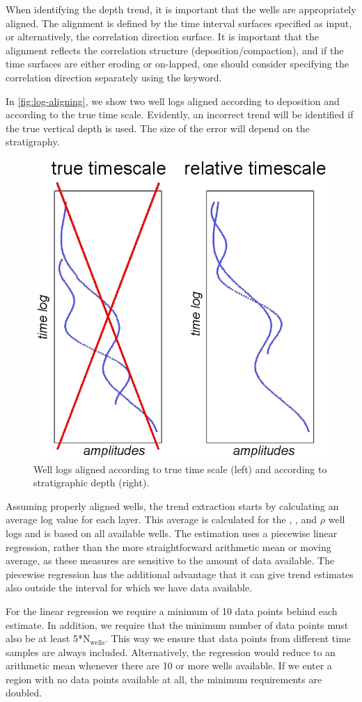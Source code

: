 When identifying the depth trend, it is important that the wells are
appropriately aligned. The alignment is defined by the time interval
surfaces specified as input, or alternatively, the correlation
direction surface. It is important that the alignment reflects the
correlation structure (deposition/compaction), and if the time
surfaces are either eroding or on-lapped, one should consider specifying
the correlation direction separately using the
 keyword.

In \autoref{fig:log-aligning}, we show two well logs aligned according
to deposition and according to the true time scale. Evidently, an
incorrect trend will be identified if the true vertical depth is
used. The size of the error will depend on the stratigraphy.

\begin{figure}
\centering
\includegraphics[width=.45\linewidth]{images/implementation/Trend-analysis_dep-vs-comp}
\caption{Well logs aligned according to true time scale (left) and
         according to stratigraphic depth (right).}
\label{fig:log-aligning}
\end{figure}

Assuming properly aligned wells, the trend extraction starts by
calculating an average log value for each layer. This average is
calculated for the \vp, \vs, and $\rho$ well logs and is based on all
available wells. The estimation uses a piecewise linear regression,
rather than the more straightforward arithmetic mean or moving
average, as these measures are sensitive to the amount of data
available. The piecewise regression has the additional advantage
that it can give trend estimates also outside the interval for which
we have data available.

For the linear regression we require a minimum of 10 data points
behind each estimate. In addition, we require that the minimum number
of data points must also be at least 5*N$_\text{wells}$. This way we
ensure that data points from different time samples are always
included. Alternatively, the regression would reduce to an arithmetic
mean whenever there are 10 or more wells available. If we enter a region
with no data points available at all, the minimum requirements are
doubled.

